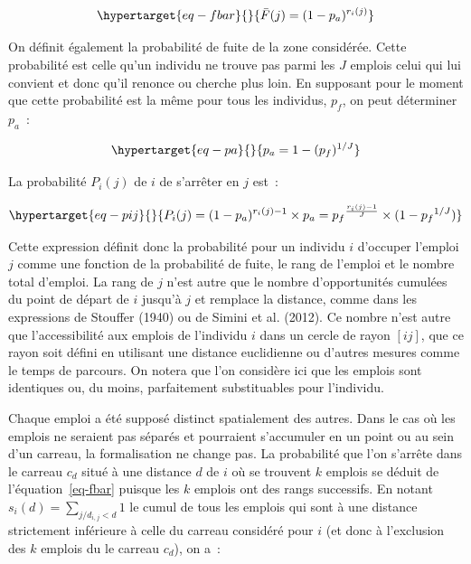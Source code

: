 \documentclass[
  10pt,
  a4paper,
  numbers=noendperiod,
  DIV=9]{scrartcl}
\begin{document}
\begin{equation}\protect\hypertarget{eq-fbar}{}{
\bar F(j)=(1-p_a)^{r_i(j)}
}\label{eq-fbar}\end{equation}

On définit également la probabilité de fuite de la zone considérée.
Cette probabilité est celle qu'un individu ne trouve pas parmi les \(J\)
emplois celui qui lui convient et donc qu'il renonce ou cherche plus
loin. En supposant pour le moment que cette probabilité est la même pour
tous les individus, \(p_f\), on peut déterminer \(p_a\)~:

\begin{equation}\protect\hypertarget{eq-pa}{}{
p_a = 1-(p_f)^{1/J}
}\label{eq-pa}\end{equation}

La probabilité \(P_i(j)\) de \(i\) de s'arrêter en \(j\) est~:

\begin{equation}\protect\hypertarget{eq-pij}{}{
P_i(j) = (1-p_a)^{r_i(j)-1} \times p_a = {p_f}^{\frac {r_i(j)-1} {J}} \times (1-{p_f}^{1/J})
}\label{eq-pij}\end{equation}

Cette expression définit donc la probabilité pour un individu \(i\)
d'occuper l'emploi \(j\) comme une fonction de la probabilité de fuite,
le rang de l'emploi et le nombre total d'emploi. La rang de \(j\) n'est
autre que le nombre d'opportunités cumulées du point de départ de \(i\)
jusqu'à \(j\) et remplace la distance, comme dans les expressions de
Stouffer (1940) ou de Simini et al. (2012). Ce nombre n'est autre que
l'accessibilité aux emplois de l'individu \(i\) dans un cercle de rayon
\([ij]\), que ce rayon soit défini en utilisant une distance euclidienne
ou d'autres mesures comme le temps de parcours. On notera que l'on
considère ici que les emplois sont identiques ou, du moins, parfaitement
substituables pour l'individu.

Chaque emploi a été supposé distinct spatialement des autres. Dans le
cas où les emplois ne seraient pas séparés et pourraient s'accumuler en
un point ou au sein d'un carreau, la formalisation ne change pas. La
probabilité que l'on s'arrête dans le carreau \(c_d\) situé à une
distance \(d\) de \(i\) où se trouvent \(k\) emplois se déduit de
l'équation~\ref{eq-fbar} puisque les \(k\) emplois ont des rangs
successifs. En notant \(s_i(d)=\sum _{j/d_{i,j}<d}1\) le cumul de tous
les emplois qui sont à une distance strictement inférieure à celle du
carreau considéré pour \(i\) (et donc à l'exclusion des \(k\) emplois du
le carreau \(c_d\)), on a~:
\end{document}
